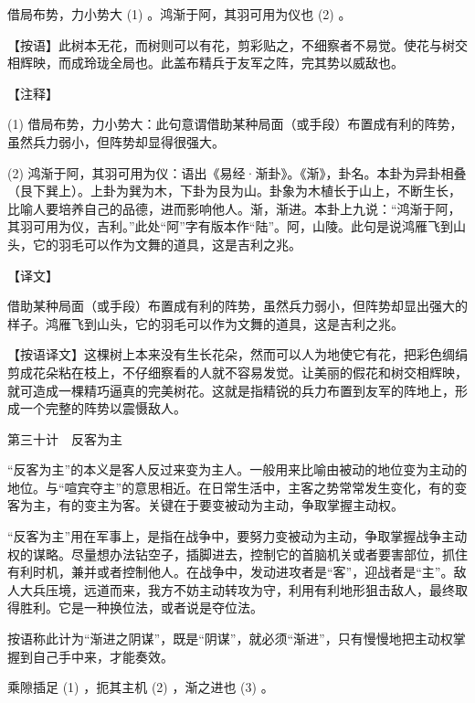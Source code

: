 \documentclass[12pt,UTF8]{ctexbook}
\begin{document}
借局布势，力小势大 (1) 。鸿渐于阿，其羽可用为仪也 (2) 。

【按语】此树本无花，而树则可以有花，剪彩贴之，不细察者不易觉。使花与树交相辉映，而成玲珑全局也。此盖布精兵于友军之阵，完其势以威敌也。





【注释】


(1) 借局布势，力小势大：此句意谓借助某种局面（或手段）布置成有利的阵势，虽然兵力弱小，但阵势却显得很强大。

(2) 鸿渐于阿，其羽可用为仪：语出《易经·渐卦》。《渐》，卦名。本卦为异卦相叠（艮下巽上）。上卦为巽为木，下卦为艮为山。卦象为木植长于山上，不断生长，比喻人要培养自己的品德，进而影响他人。渐，渐进。本卦上九说：“鸿渐于阿，其羽可用为仪，吉利。”此处“阿”字有版本作“陆”。阿，山陵。此句是说鸿雁飞到山头，它的羽毛可以作为文舞的道具，这是吉利之兆。





【译文】


借助某种局面（或手段）布置成有利的阵势，虽然兵力弱小，但阵势却显出强大的样子。鸿雁飞到山头，它的羽毛可以作为文舞的道具，这是吉利之兆。

【按语译文】这棵树上本来没有生长花朵，然而可以人为地使它有花，把彩色绸绢剪成花朵粘在枝上，不仔细察看的人就不容易发觉。让美丽的假花和树交相辉映，就可造成一棵精巧逼真的完美树花。这就是指精锐的兵力布置到友军的阵地上，形成一个完整的阵势以震慑敌人。





第三十计　反客为主


“反客为主”的本义是客人反过来变为主人。一般用来比喻由被动的地位变为主动的地位。与“喧宾夺主”的意思相近。在日常生活中，主客之势常常发生变化，有的变客为主，有的变主为客。关键在于要变被动为主动，争取掌握主动权。

“反客为主”用在军事上，是指在战争中，要努力变被动为主动，争取掌握战争主动权的谋略。尽量想办法钻空子，插脚进去，控制它的首脑机关或者要害部位，抓住有利时机，兼并或者控制他人。在战争中，发动进攻者是“客”，迎战者是“主”。敌人大兵压境，远道而来，我方不妨主动转攻为守，利用有利地形狙击敌人，最终取得胜利。它是一种换位法，或者说是夺位法。

按语称此计为“渐进之阴谋”，既是“阴谋”，就必须“渐进”，只有慢慢地把主动权掌握到自己手中来，才能奏效。





乘隙插足 (1) ，扼其主机 (2) ，渐之进也 (3) 。
\end{document}
